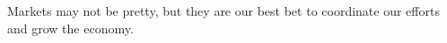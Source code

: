 Markets may not be pretty, but they are our best bet to coordinate our efforts and grow the economy.